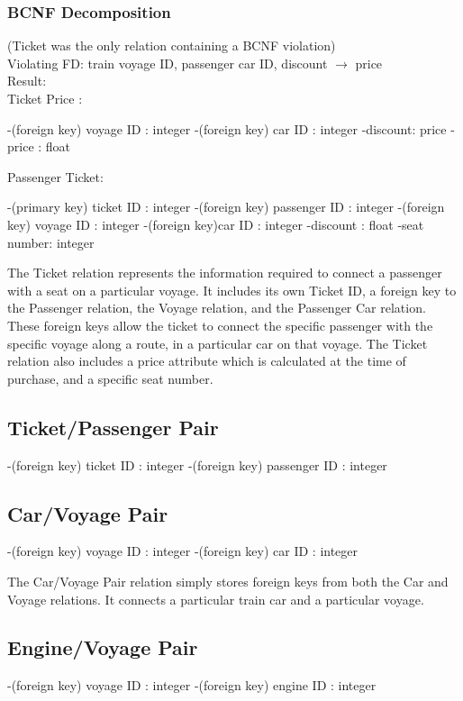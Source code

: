 \documentclass[a4paper]{article}
\begin{document}
\subsubsection*{BCNF Decomposition} 
(Ticket was the only relation containing a BCNF violation)\\
Violating FD: train voyage ID, passenger car ID, discount $\rightarrow$ price\\
Result:\\
Ticket Price :
\begin{itemize}
-(foreign key) voyage ID : integer
-(foreign key) car ID : integer
-discount: price
-price : float 
\end{itemize}
Passenger Ticket:
\begin{itemize}
-(primary key) ticket ID : integer
-(foreign key) passenger ID : integer
-(foreign key) voyage ID : integer
-(foreign key)car ID : integer
-discount : float
-seat number: integer
\end{itemize}

The Ticket relation represents the information required to connect a passenger with a seat on a particular voyage. It includes its own Ticket ID, a foreign key to the Passenger relation, the Voyage relation, and the Passenger Car relation. These foreign keys allow the ticket to connect the specific passenger with the specific voyage along a route, in a particular car on that voyage. The Ticket relation also includes a price attribute which is calculated at the time of purchase, and a specific seat number.

\subsection*{Ticket/Passenger Pair}
\begin{itemize}
-(foreign key) ticket ID : integer
-(foreign key) passenger ID : integer
\end{itemize}
	
\subsection*{Car/Voyage Pair}
\begin{itemize}
-(foreign key) voyage ID : integer
-(foreign key) car ID : integer
\end{itemize}
The Car/Voyage Pair relation simply stores foreign keys from both the Car and Voyage relations. It connects a particular train car and a particular voyage.

\subsection*{Engine/Voyage Pair}
\begin{itemize}
-(foreign key) voyage ID : integer
-(foreign key) engine ID : integer
\end{itemize}
\end{document}
